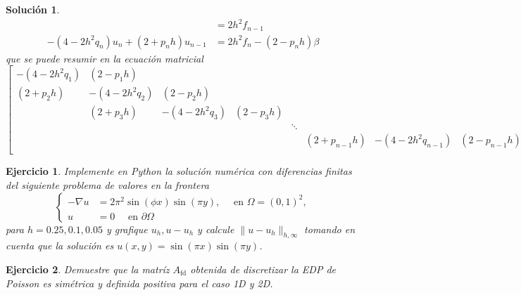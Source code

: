 \documentclass[11pt]{article}
\newtheorem{exercise}{Ejercicio}
\newtheorem*{sol}{Solución}
\newcommand\fd{\mathrm{fd}}
\begin{document}
\begin{sol}
\begin{align}
    &=
    2h^{2}f_{n-1}
    \\
    -(4-2h^{2}q_n)u_{n}+(2 + p_n h)u_{n-1}
    &=
    2h^{2}f_n
    -(2-p_nh)\beta
  \end{align}
  que se puede resumir en la ecuación matricial
  \begin{equation}
    \begin{bmatrix}
      -(4-2h^{2}q_1) & (2-p_1h) \\
      (2+p_2h) & -(4-2h^{2}q_2) & (2-p_2h) \\
               & (2+p_3h) & -(4-2h^{2}q_3) & (2-p_3h) \\
               & & & & \ddots \\
               &&&&& (2+p_{n-1}h) & -(4-2h^{2}q_{n-1}) & (2-p_{n-1}h) \\
    \end{bmatrix}
  ,\end{equation}
  
  
  
\end{sol}

\begin{exercise}
  Implemente en Python la solución numérica con diferencias finitas
  del siguiente problema de valores en la frontera
  \begin{equation}
    \left\{
      \begin{aligned}
        -\nabla u &= 2\pi^{2}\sin(\phi x)\sin(\pi y),
        \quad \text{ en } \Omega = (0,1) ^{2},
        \\
        u &= 0 
        \quad \text{ en } \partial\Omega
      \end{aligned}
    \right.
  \end{equation}
  para $h=0.25,0.1,0.05$ y grafique $u_h,u-u_h$ y calcule
  $\|u-u_h\|_{h,\infty}$ tomando en cuenta que la solución es
  $u(x,y)=\sin(\pi x)\sin(\pi y)$.
\end{exercise}

\begin{exercise}
  Demuestre que la matríz $A_{\fd}$ obtenida de discretizar la EDP de
  Poisson es simétrica y definida positiva para el caso 1D y 2D.
\end{exercise}
\end{document}
